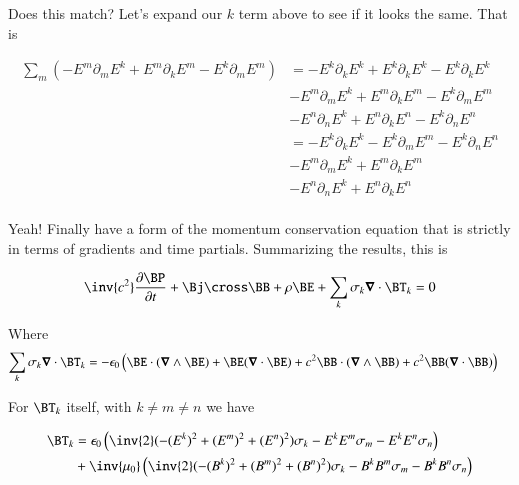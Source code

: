 Does this match?  Let's expand our $k$ term above to see if it looks the same.  That is

\begin{align*}
\sum_m (-E^m \partial_m E^k +E^m \partial_k E^m -E^k \partial_m E^m) 
&=
-E^k \partial_k E^k 
+E^k \partial_k E^k 
-E^k \partial_k E^k \\
&-E^m \partial_m E^k 
+E^m \partial_k E^m 
-E^k \partial_m E^m \\
&-E^n \partial_n E^k 
+E^n \partial_k E^n 
-E^k \partial_n E^n \\
&=
-E^k \partial_k E^k 
-E^k \partial_m E^m
-E^k \partial_n E^n \\
&-E^m \partial_m E^k 
+E^m \partial_k E^m \\
&-E^n \partial_n E^k 
+E^n \partial_k E^n \\
\end{align*}

Yeah!  Finally have a form of the momentum conservation equation that is strictly in terms of gradients and time partials.  Summarizing the results, this is

\begin{align}
\inv{c^2}\PD{t}{\BP} + \Bj \cross \BB + \rho \BE + \sum_k \sigma_k \spacegrad \cdot \BT_k = 0
\end{align}

Where
\begin{align*}
\sum_k \sigma_k \spacegrad \cdot \BT_k
&=
-\epsilon_0 \left(
\BE \cdot (\spacegrad \wedge \BE) + \BE (\spacegrad \cdot \BE) 
+ c^2 \BB \cdot (\spacegrad \wedge \BB) 
+ c^2 \BB (\spacegrad \cdot \BB) \right)
\end{align*}

For $\BT_k$ itself, with $k \ne m \ne n$ we have

\begin{align*}
\BT_k &= 
\epsilon_0 \left( \inv{2}(-(E^k)^2 + (E^m)^2 + (E^n)^2)\sigma_k - E^k E^m \sigma_m - E^k E^n \sigma_n \right) \\
&+ \inv{\mu_0}\left(\inv{2}(-(B^k)^2 + (B^m)^2 + (B^n)^2)\sigma_k - B^k B^m \sigma_m - B^k B^n \sigma_n \right)
\end{align*}
